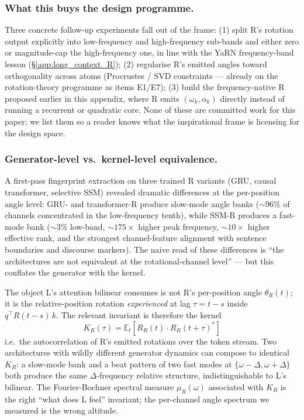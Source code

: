 \documentclass[10pt, twocolumn, a4paper]{article}
\begin{document}
\subsubsection*{What this buys the design programme.} Three concrete follow-up experiments fall out of the frame: (1) split R's rotation output explicitly into low-frequency and high-frequency sub-bands and either zero or magnitude-cap the high-frequency one, in line with the YaRN frequency-band lesson (\S\ref{app:long_context_R}); (2) regularise R's emitted angles toward orthogonality across atoms (Procrustes / SVD constraints --- already on the rotation-theory programme as items E1/E7); (3) build the frequency-native R proposed earlier in this appendix, where R emits $(\omega_k, \alpha_k)$ directly instead of running a recurrent or quadratic core. None of these are committed work for this paper; we list them so a reader knows what the inspirational frame is licensing for the design space.

\subsubsection*{Generator-level vs.\ kernel-level equivalence.} A first-pass fingerprint extraction on three trained R variants (GRU, causal transformer, selective SSM) revealed dramatic differences at the per-position angle level: GRU- and transformer-R produce slow-mode angle banks ($\sim\!96\%$ of channels concentrated in the low-frequency tenth), while SSM-R produces a fast-mode bank ($\sim\!3\%$ low-band, $\sim\!175\times$ higher peak frequency, $\sim\!10\times$ higher effective rank, and the strongest channel-feature alignment with sentence boundaries and discourse markers). The naive read of these differences is ``the architectures are not equivalent at the rotational-channel level'' --- but this conflates the generator with the kernel.

The object L's attention bilinear consumes is not R's per-position angle $\theta_R(t)$; it is the relative-position rotation \emph{experienced} at lag $\tau = t-s$ inside $q^\top R(t-s)\,k$. The relevant invariant is therefore the kernel
\[
K_R(\tau) = \mathbb{E}_t\!\left[R_R(t) \cdot R_R(t+\tau)^*\right]
\]
i.e.\ the autocorrelation of R's emitted rotations over the token stream. Two architectures with wildly different generator dynamics can compose to identical $K_R$: a slow-mode bank and a beat pattern of two fast modes at $\{\omega - \Delta, \omega + \Delta\}$ both produce the same $\Delta$-frequency relative structure, indistinguishable to L's bilinear. The Fourier-Bochner spectral measure $\mu_R(\omega)$ associated with $K_R$ is the right ``what does L feel'' invariant; the per-channel angle spectrum we measured is the wrong altitude.
\end{document}
